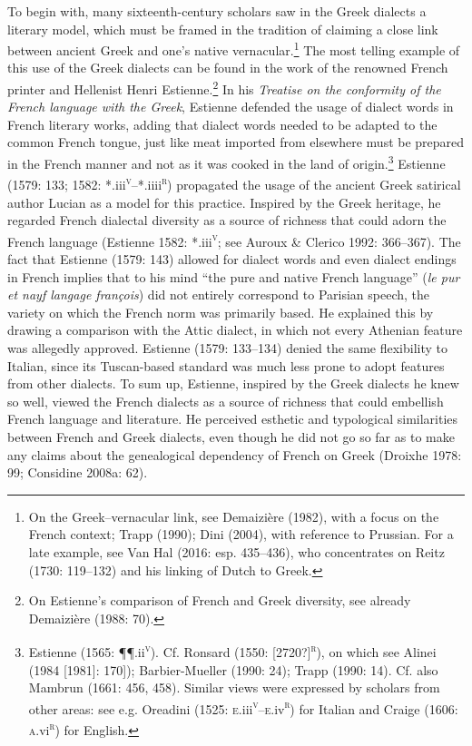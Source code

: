 \begin{styleStandard}
To begin with, many sixteenth-century scholars saw in the Greek dialects a literary model, which must be framed in the tradition of claiming a close link between ancient Greek and one’s native vernacular.\footnote{ On the Greek–vernacular link, see Demaizière (1982), with a focus on the French context; Trapp (1990); Dini (2004), with reference to Prussian. For a late example, see Van Hal (2016: esp. 435–436), who concentrates on Reitz (1730: 119–132) and his linking of Dutch to Greek.} The most telling example of this use of the Greek dialects can be found in the work of the renowned French printer and Hellenist Henri Estienne.\footnote{ On Estienne’s comparison of French and Greek diversity, see already Demaizière (1988: 70).} In his \textit{Treatise on the conformity of the French language with the Greek},\textit{ }Estienne defended the usage of dialect words in French literary works, adding that dialect words needed to be adapted to the common French tongue, just like meat imported from elsewhere must be prepared in the French manner and not as it was cooked in the land of origin.\footnote{ Estienne (1565: ¶¶.ii\textsc{\textsuperscript{v}}). Cf. Ronsard (1550: [2720?]\textsc{\textsuperscript{r}}), on which see Alinei (1984 [1981]: 170]); Barbier-Mueller (1990: 24); Trapp (1990: 14). Cf. also Mambrun (1661: 456, 458). Similar views were expressed by scholars from other areas: see e.g. Oreadini (1525: \textsc{e.}iii\textsc{\textsuperscript{v}}–\textsc{e.}iv\textsc{\textsuperscript{r}}) for Italian and Craige (1606: \textsc{a}.vi\textsc{\textsuperscript{r}}) for English.} Estienne (1579: 133; 1582: *.iii\textsc{\textsuperscript{v}}–*.iiii\textsc{\textsuperscript{r}}) propagated the usage of the ancient Greek satirical author Lucian as a model for this practice. Inspired by the Greek heritage, he regarded French dialectal diversity as a source of richness that could adorn the French language (Estienne 1582: *.iii\textsc{\textsuperscript{v}}; see Auroux \& Clerico 1992: 366–367). The fact that Estienne (1579: 143) allowed for dialect words and even dialect endings in French implies that to his mind “the pure and native French language” (\textit{le pur et nayf langage françois}) did not entirely correspond to Parisian speech, the variety on which the French norm was primarily based. He explained this by drawing a comparison with the Attic dialect, in which not every Athenian feature was allegedly approved. Estienne (1579: 133–134) denied the same flexibility to Italian, since its Tuscan-based standard was much less prone to adopt features from other dialects. To sum up, Estienne, inspired by the Greek dialects he knew so well, viewed the French dialects as a source of richness that could embellish French language and literature. He perceived esthetic and typological similarities between French and Greek dialects, even though he did not go so far as to make any claims about the genealogical dependency of French on Greek (Droixhe 1978: 99; Considine 2008a: 62).
\end{styleStandard}


